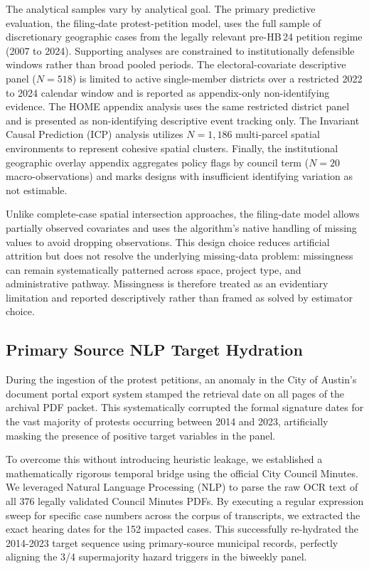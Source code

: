 \documentclass[twoside,11pt]{article}
\begin{document}
The analytical samples vary by analytical goal. The primary predictive evaluation, the filing-date protest-petition model, uses the full sample of \metricBaselineCases{} discretionary geographic cases from the legally relevant pre-HB\,24 petition regime (2007 to 2024). Supporting analyses are constrained to institutionally defensible windows rather than broad pooled periods. The electoral-covariate descriptive panel ($N=518$) is limited to active single-member districts over a restricted 2022 to 2024 calendar window and is reported as appendix-only non-identifying evidence. The HOME appendix analysis uses the same restricted district panel and is presented as non-identifying descriptive event tracking only. The Invariant Causal Prediction (ICP) analysis utilizes $N=1,186$ multi-parcel spatial environments to represent cohesive spatial clusters. Finally, the institutional geographic overlay appendix aggregates policy flags by council term ($N=20$ macro-observations) and marks designs with insufficient identifying variation as not estimable.

Unlike complete-case spatial intersection approaches, the filing-date model allows partially observed covariates and uses the algorithm's native handling of missing values to avoid dropping observations. This design choice reduces artificial attrition but does not resolve the underlying missing-data problem: missingness can remain systematically patterned across space, project type, and administrative pathway. Missingness is therefore treated as an evidentiary limitation and reported descriptively rather than framed as solved by estimator choice.

\subsection{Primary Source NLP Target Hydration}

During the ingestion of the protest petitions, an anomaly in the City of Austin's document portal export system stamped the retrieval date on all pages of the archival PDF packet. This systematically corrupted the formal signature dates for the vast majority of protests occurring between 2014 and 2023, artificially masking the presence of positive target variables in the panel. 

To overcome this without introducing heuristic leakage, we established a mathematically rigorous temporal bridge using the official City Council Minutes. We leveraged Natural Language Processing (NLP) to parse the raw OCR text of all 376 legally validated Council Minutes PDFs. By executing a regular expression sweep for specific case numbers across the corpus of transcripts, we extracted the exact hearing dates for the 152 impacted cases. This successfully re-hydrated the 2014-2023 target sequence using primary-source municipal records, perfectly aligning the 3/4 supermajority hazard triggers in the biweekly panel.
\end{document}
